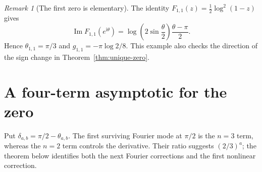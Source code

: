 \documentclass[11pt,a4paper]{article}
\numberwithin{equation}{section}
\theoremstyle{definition}
\theoremstyle{remark}
\newtheorem{remark}[theorem]{Remark}
\newcommand{\Imag}{\operatorname{Im}}
\newcommand{\ii}{\mathrm{i}}
\begin{document}
\begin{remark}[The first zero is elementary]
The identity $F_{1,1}(z)=\tfrac12\log^2(1-z)$ gives
\[
 \Imag F_{1,1}(e^{\ii\theta})
 =\log\!\left(2\sin\frac\theta2\right)\frac{\theta-\pi}{2}.
\]
Hence $\theta_{1,1}=\pi/3$ and $g_{1,1}=-\pi\log2/8$. This example also checks the direction of the sign change in Theorem~\ref{thm:unique-zero}.
\end{remark}

\section{A four-term asymptotic for the zero}
\label{sec:zero-asymptotic}
Put $\delta_{a,b}=\pi/2-\theta_{a,b}$. The first surviving Fourier mode at $\pi/2$ is the $n=3$ term, whereas the $n=2$ term controls the derivative. Their ratio suggests $(2/3)^a$; the theorem below identifies both the next Fourier corrections and the first nonlinear correction.
\end{document}
